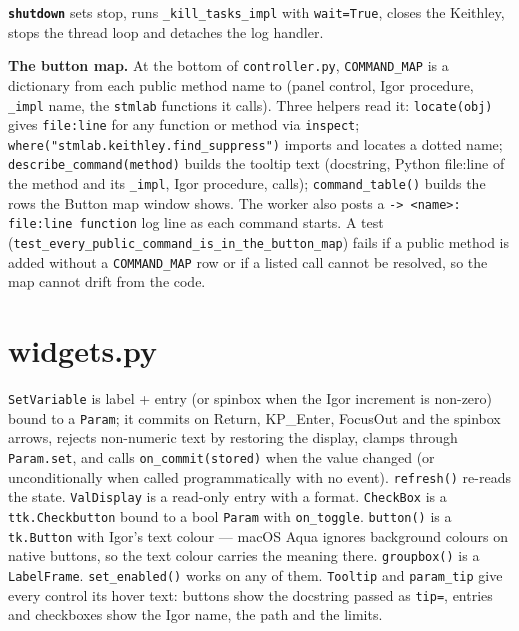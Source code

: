 \textbf{\texttt{shutdown}} sets stop, runs \texttt{\_\discretionary{}{}{}kill\_\discretionary{}{}{}tasks\_\discretionary{}{}{}impl} with \texttt{wait=True}, closes the Keithley, stops the thread loop and detaches the log handler.

\textbf{The button map.} At the bottom of \texttt{controller.\discretionary{}{}{}py}, \texttt{COMMAND\_\discretionary{}{}{}MAP} is a dictionary from each public method name to (panel control, Igor procedure, \texttt{\_\discretionary{}{}{}impl} name, the \texttt{stmlab} functions it calls). Three helpers read it: \texttt{locate(obj)} gives \texttt{file:line} for any function or method via \texttt{inspect}; \texttt{where("stmlab.\discretionary{}{}{}keithley.\discretionary{}{}{}find\_\discretionary{}{}{}suppress")} imports and locates a dotted name; \texttt{describe\_\discretionary{}{}{}command(method)} builds the tooltip text (docstring, Python file:line of the method and its \texttt{\_\discretionary{}{}{}impl}, Igor procedure, calls); \texttt{command\_\discretionary{}{}{}table()} builds the rows the Button map window shows. The worker also posts a \texttt{-> <name>: file:line function} log line as each command starts. A test (\texttt{test\_\discretionary{}{}{}every\_\discretionary{}{}{}public\_\discretionary{}{}{}command\_\discretionary{}{}{}is\_\discretionary{}{}{}in\_\discretionary{}{}{}the\_\discretionary{}{}{}button\_\discretionary{}{}{}map}) fails if a public method is added without a \texttt{COMMAND\_\discretionary{}{}{}MAP} row or if a listed call cannot be resolved, so the map cannot drift from the code.

\section{widgets.py}

\texttt{Set\discretionary{}{}{}Variable} is label + entry (or spinbox when the Igor increment is non-zero) bound to a \texttt{Param}; it commits on Return, KP\_Enter, FocusOut and the spinbox arrows, rejects non-numeric text by restoring the display, clamps through \texttt{Param.\discretionary{}{}{}set}, and calls \texttt{on\_\discretionary{}{}{}commit(stored)} when the value changed (or unconditionally when called programmatically with no event). \texttt{refresh()} re-reads the state. \texttt{Val\discretionary{}{}{}Display} is a read-only entry with a format. \texttt{Check\discretionary{}{}{}Box} is a \texttt{ttk.\discretionary{}{}{}Checkbutton} bound to a bool \texttt{Param} with \texttt{on\_\discretionary{}{}{}toggle}. \texttt{button()} is a \texttt{tk.\discretionary{}{}{}Button} with Igor's text colour --- macOS Aqua ignores background colours on native buttons, so the text colour carries the meaning there. \texttt{groupbox()} is a \texttt{Label\discretionary{}{}{}Frame}. \texttt{set\_\discretionary{}{}{}enabled()} works on any of them. \texttt{Tooltip} and \texttt{param\_\discretionary{}{}{}tip} give every control its hover text: buttons show the docstring passed as \texttt{tip=}, entries and checkboxes show the Igor name, the path and the limits.

